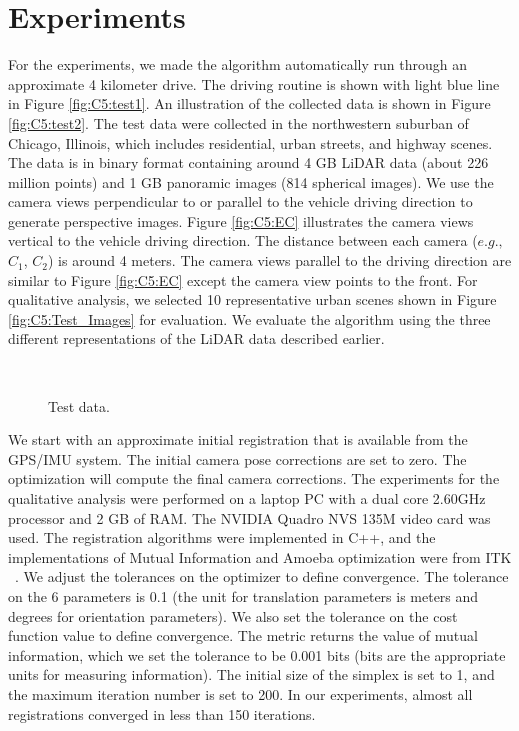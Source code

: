 \section{Experiments}

For the experiments, we made the algorithm automatically run through an approximate 4 kilometer drive. The driving routine is  shown with light blue line in Figure \ref{fig:C5:test1}. An illustration of the collected data is shown in Figure \ref{fig:C5:test2}. The test data were collected in the northwestern suburban of Chicago, Illinois, which includes residential, urban streets, and highway scenes. The data is in binary format containing around 4 GB LiDAR data (about 226 million points) and 1 GB panoramic images (814 spherical images). We use the camera views perpendicular to or parallel to the vehicle driving direction to generate  perspective images. Figure \ref{fig:C5:EC} illustrates the camera views vertical to the vehicle driving direction. The distance between each camera ($e.g.,$ $C_1$, $C_2$) is around 4 meters. The camera views parallel to the driving direction are similar to Figure \ref{fig:C5:EC} except the camera view points to the front. For qualitative analysis, we selected 10 representative urban scenes shown in Figure \ref{fig:C5:Test_Images} for evaluation. We evaluate the algorithm using the three different representations of the LiDAR data described earlier. 

\begin{figure}[H]
\centering
{} 
\hspace{.1in}
 \\
\caption{Test data.} 
\label{fig:C5:testdata}
\end{figure}

We start with an approximate initial registration that is available from the GPS/IMU system. The initial camera pose corrections are set to zero. The optimization will compute the final camera corrections. The experiments for the qualitative analysis were performed on a laptop PC with a dual core 2.60GHz processor and 2 GB of RAM. The NVIDIA Quadro NVS 135M video card was used. The registration algorithms were implemented in C++,  and the implementations of Mutual Information and Amoeba optimization were from ITK ~\cite{itk-url}. We adjust the tolerances on the optimizer to define convergence. The tolerance on the 6 parameters is 0.1 (the unit for translation parameters is meters and degrees for orientation parameters). We also set the tolerance on the cost function value to define convergence. The metric returns the value of mutual information, which we set the tolerance to be 0.001 bits (bits are the appropriate units for measuring information). The initial size of the simplex is set to 1, and the maximum iteration number is set to 200. In our experiments, almost all registrations converged in less than 150 iterations. 

